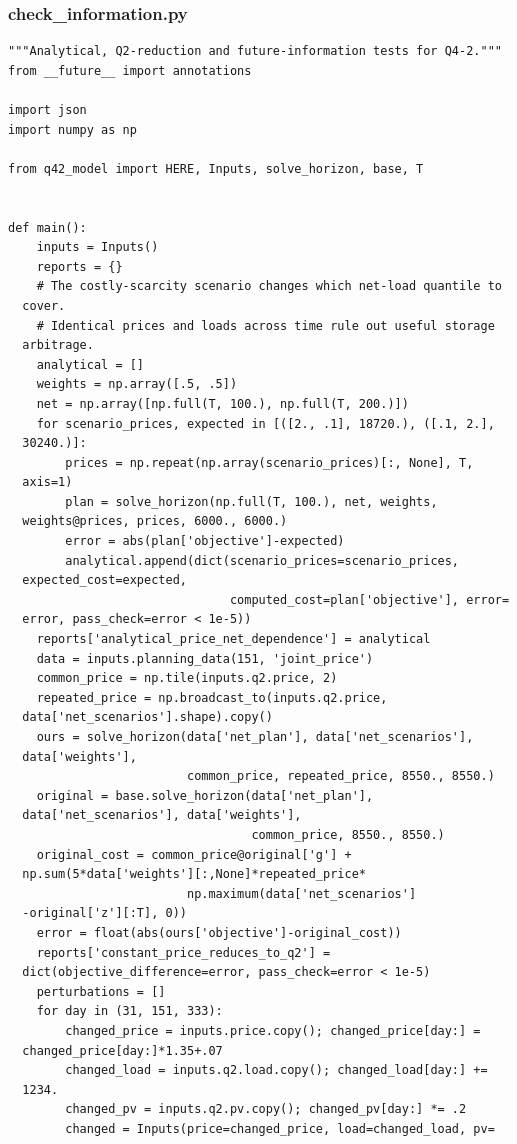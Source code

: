 \subsubsection*{check\_information.py}
\begin{verbatim}
"""Analytical, Q2-reduction and future-information tests for Q4-2."""
from __future__ import annotations

import json
import numpy as np

from q42_model import HERE, Inputs, solve_horizon, base, T


def main():
    inputs = Inputs()
    reports = {}
    # The costly-scarcity scenario changes which net-load quantile to
  cover.
    # Identical prices and loads across time rule out useful storage
  arbitrage.
    analytical = []
    weights = np.array([.5, .5])
    net = np.array([np.full(T, 100.), np.full(T, 200.)])
    for scenario_prices, expected in [([2., .1], 18720.), ([.1, 2.],
  30240.)]:
        prices = np.repeat(np.array(scenario_prices)[:, None], T,
  axis=1)
        plan = solve_horizon(np.full(T, 100.), net, weights,
  weights@prices, prices, 6000., 6000.)
        error = abs(plan['objective']-expected)
        analytical.append(dict(scenario_prices=scenario_prices,
  expected_cost=expected,
                               computed_cost=plan['objective'], error=
  error, pass_check=error < 1e-5))
    reports['analytical_price_net_dependence'] = analytical
    data = inputs.planning_data(151, 'joint_price')
    common_price = np.tile(inputs.q2.price, 2)
    repeated_price = np.broadcast_to(inputs.q2.price,
  data['net_scenarios'].shape).copy()
    ours = solve_horizon(data['net_plan'], data['net_scenarios'],
  data['weights'],
                         common_price, repeated_price, 8550., 8550.)
    original = base.solve_horizon(data['net_plan'],
  data['net_scenarios'], data['weights'],
                                  common_price, 8550., 8550.)
    original_cost = common_price@original['g'] +
  np.sum(5*data['weights'][:,None]*repeated_price*
                         np.maximum(data['net_scenarios']
  -original['z'][:T], 0))
    error = float(abs(ours['objective']-original_cost))
    reports['constant_price_reduces_to_q2'] =
  dict(objective_difference=error, pass_check=error < 1e-5)
    perturbations = []
    for day in (31, 151, 333):
        changed_price = inputs.price.copy(); changed_price[day:] =
  changed_price[day:]*1.35+.07
        changed_load = inputs.q2.load.copy(); changed_load[day:] +=
  1234.
        changed_pv = inputs.q2.pv.copy(); changed_pv[day:] *= .2
        changed = Inputs(price=changed_price, load=changed_load, pv=

\end{verbatim}
